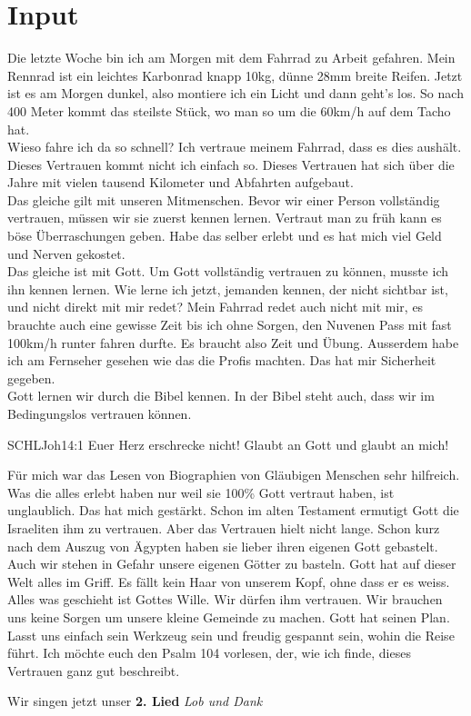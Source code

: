\section{ Input }
\begin{spacing}{1.5}
Die letzte Woche bin ich am Morgen mit dem Fahrrad zu Arbeit gefahren. Mein Rennrad ist ein leichtes Karbonrad knapp 10kg, dünne 28mm breite Reifen. Jetzt ist es am Morgen dunkel, also montiere ich ein Licht und dann geht's los. So nach 400 Meter kommt das steilste Stück, wo man so um die 60km/h auf dem Tacho hat. \\
Wieso fahre ich da so schnell? Ich vertraue meinem Fahrrad, dass es dies aushält. Dieses Vertrauen kommt nicht ich einfach so. Dieses Vertrauen hat sich über die Jahre mit vielen tausend Kilometer und Abfahrten aufgebaut. \\
Das gleiche gilt mit unseren Mitmenschen. Bevor wir einer Person vollständig vertrauen, müssen wir sie zuerst kennen lernen. Vertraut man zu früh kann es böse Überraschungen geben. Habe das selber erlebt und es hat mich viel Geld und Nerven gekostet.  \\
Das gleiche ist mit Gott. Um Gott vollständig vertrauen zu können, musste ich ihn kennen lernen. Wie lerne ich jetzt, jemanden kennen, der nicht sichtbar ist, und nicht direkt mit mir redet? Mein Fahrrad redet auch nicht mit mir, es brauchte auch eine gewisse Zeit bis ich ohne Sorgen, den Nuvenen Pass mit fast 100km/h runter fahren durfte. Es braucht also Zeit und Übung. Ausserdem habe ich am Fernseher gesehen wie das die Profis machten. Das hat mir Sicherheit gegeben. \\
Gott lernen wir durch die Bibel kennen. In der Bibel steht auch, dass wir im Bedingungslos vertrauen können.
\begin{bibelbox}{SCHL}{Joh}{14:1}
Euer Herz erschrecke nicht! Glaubt an Gott und glaubt an mich!
\end{bibelbox}
Für mich war das Lesen von Biographien von Gläubigen Menschen sehr hilfreich. Was die alles erlebt haben nur weil sie 100\% Gott vertraut haben, ist unglaublich. Das hat mich gestärkt.
Schon im alten Testament ermutigt Gott die Israeliten ihm zu vertrauen. Aber das Vertrauen hielt nicht lange. Schon kurz nach dem Auszug von Ägypten haben sie lieber ihren eigenen Gott gebastelt. \\
Auch wir stehen in Gefahr unsere eigenen Götter zu basteln. Gott hat auf dieser Welt alles im Griff. Es fällt kein Haar von unserem Kopf, ohne dass er es weiss. Alles was geschieht ist Gottes Wille. Wir dürfen ihm vertrauen. Wir brauchen uns keine Sorgen um unsere kleine Gemeinde zu machen. Gott hat seinen Plan. Lasst uns einfach sein Werkzeug sein und freudig gespannt sein, wohin die Reise führt.
Ich möchte euch den Psalm 104 vorlesen, der, wie ich finde, dieses Vertrauen ganz gut beschreibt.

\end{spacing}
Wir singen jetzt unser \textbf{2. Lied} \textit{Lob und Dank}

